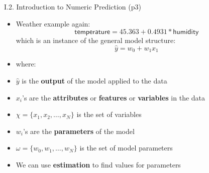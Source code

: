 \documentclass[handout]{beamer}
\newcommand{\strong}[1]{\textbf{\color{teal} #1}}
\newcommand{\stronger}[1]{\textbf{\color{purple} #1}}
\begin{document}
\begin{frame}{I.2. Introduction to Numeric Prediction (p3)}
\begin{itemize}
\item Weather example again:
\[
	\mathsf{temperature} = 45.363 + 0.4931 * \mathsf{humidity}
\]
which is an instance of the general model structure:
\[
	\hat{y} = w_0 + w_1 x_1
\]
\item[] where:
\item $\hat{y}$ is the \textbf{output} of the model applied to the data
\item $x_i$'s are the \strong{attributes} or \strong{features} or \strong{variables} in the data
\item[] ${\chi} = \{ x_1, x_2, \ldots, x_N \}$ is the set of variables
\item $w_i$'s are the \strong{parameters} of the model
\item[] $\omega = \{ w_0, w_1, \ldots, w_N \}$ is the set of model parameters
\item We can use \stronger{estimation} to find values for parameters
\end{itemize}
\end{frame}
\end{document}
